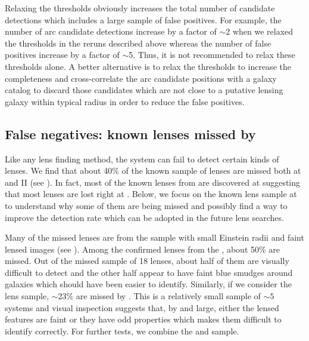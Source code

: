 \documentclass[useAMS,usenatbib,a4paper]{mn2e}
\begin{document}
Relaxing the thresholds obviously increases the total number of
candidate detections which includes a large sample of false positives.
For example, the number of arc candidate detections increase by a factor
of $\sim$2 when we relaxed the thresholds in the reruns described above
whereas the number of false positives increase by a factor of $\sim$5.
Thus, it is not recommended to relax these thresholds alone. A better
alternative is to relax the thresholds to increase the completeness and
cross-correlate the arc candidate positions with a galaxy catalog to
discard those candidates which are not close to a putative lensing
galaxy within typical radius in order to reduce the false positives.




\subsection{False negatives: known lenses missed by \sw}
\label{sec:fn}
Like any lens finding method, the \sw system can fail to detect certain
kinds of lenses.  We find that about 40\% of the known sample of lenses
are missed both at \StageOne and II (see ). In fact, most
of the known lenses from \StageOne are discovered at \StageTwo suggesting
that most lenses are lost right at \StageOne. Below, we focus on the known
lens sample at \StageOne to understand why some of them are being missed
and possibly find a way to improve the detection rate which can be
adopted in the future \sw lens searches.

Many of the missed lenses are from the \rf sample with small
Einstein radii and faint lensed images (see ). Among
the confirmed lenses from the \rf, about 50\% are missed. Out of the
missed sample of 18 lenses, about half of them are visually difficult to
detect and the other half appear to have faint blue smudges around
galaxies which should have been easier to identify. Similarly,
if we consider the \af lens sample, $\sim$23\% are missed by \sw. This
is a relatively small sample of $\sim 5$ systems and visual inspection
suggests that, by and large, either the lensed features are faint
or they have odd properties which makes them difficult to identify
correctly. For further tests, we combine the \rf and \af sample.
\end{document}
